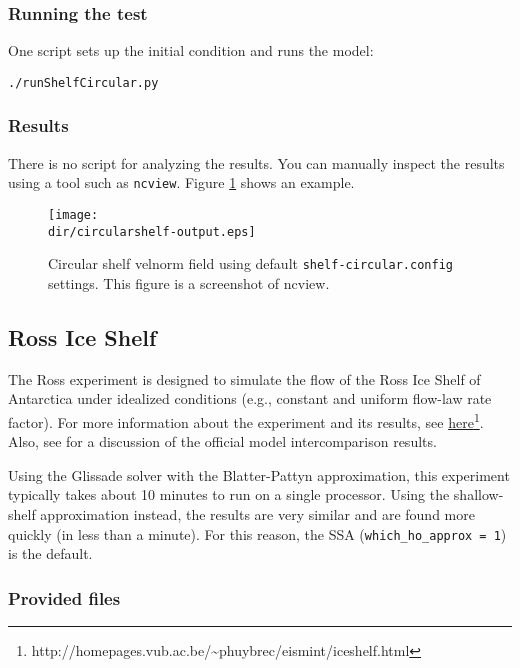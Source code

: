 \subsubsection{Running the test}
One script sets up the initial condition and runs the model:

\texttt{./runShelfCircular.py}

\subsubsection{Results}
There is no  script for analyzing the results.
You can manually inspect the results using a tool such as \texttt{ncview}.
Figure \ref{fig:circularshelf-results} shows an example.

\begin{figure}[H]
	\centering
	\texttt{[image: \\dir/circularshelf-output.eps]}
	\caption{Circular shelf velnorm field using default \texttt{shelf-circular.config} settings. This figure is a screenshot of ncview.}
	\label{fig:circularshelf-results}
\end{figure}
\FloatBarrier

\subsection{Ross Ice Shelf}
\label{sc:ross_test}
The Ross experiment is designed to simulate the flow of the Ross Ice Shelf of Antarctica under idealized conditions (e.g., constant and uniform
flow-law rate factor). For more information about the experiment and its results, see 
\href{http://homepages.vub.ac.be/~phuybrec/eismint/iceshelf.html}{here}\footnote{http://homepages.vub.ac.be/\textasciitilde{}phuybrec/eismint/iceshelf.html}. 
Also, see \citet{MacAyeal:1996vn} for a discussion of the official model intercomparison results.

Using the Glissade solver with the Blatter-Pattyn approximation, this experiment typically 
takes about 10 minutes to run on a single processor.  Using the shallow-shelf approximation instead,
the results are very similar and are found more quickly (in less than a minute).
For this reason, the SSA (\texttt{which\_ho\_approx = 1}) is the default.

\subsubsection{Provided files}


